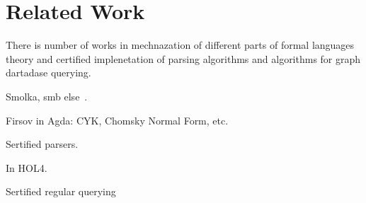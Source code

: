 \section{Related Work}

There is number of works in mechnazation of different parts of formal languages theory and certified implenetation of parsing algorithms and algorithms for graph dartadase querying.

Smolka, smb else~\cite{smolka2017regular, smolka2013regular, firsov2016cfl}. 

Firsov in Agda: CYK, Chomsky Normal Form, etc.

Sertified parsers.

In HOL4.

Sertified regular querying




